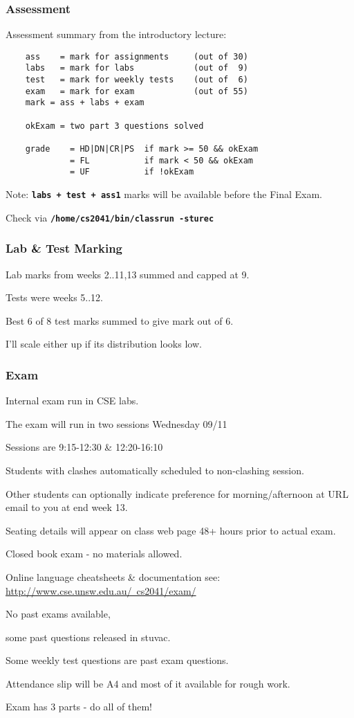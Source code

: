 \begin{frame}[fragile]
\frametitle{Assessment}
Assessment summary from the introductory lecture:
\begin{verbatim}
    ass    = mark for assignments     (out of 30)
    labs   = mark for labs            (out of  9)
    test   = mark for weekly tests    (out of  6)
    exam   = mark for exam            (out of 55)
    mark = ass + labs + exam 
   
    okExam = two part 3 questions solved
    
    grade    = HD|DN|CR|PS  if mark >= 50 && okExam
             = FL           if mark < 50 && okExam
             = UF           if !okExam
\end{verbatim}
Note: \textbf{\tt{labs + test + ass1}} marks will be available before the Final Exam.

Check via \textbf{\tt{/home/cs2041/bin/classrun -sturec}}
\end{frame}

\begin{frame}[fragile]
\frametitle{Lab \& Test Marking}
Lab marks from weeks 2..11,13 summed and capped at 9.

Tests were weeks 5..12.

Best 6 of 8 test marks summed to give mark out of 6.

I'll scale either up if its distribution looks low.

\end{frame}

\begin{frame}
\frametitle{Exam}

Internal exam run in CSE labs.

The exam will run in two sessions  Wednesday 09/11

Sessions are 9:15-12:30 \& 12:20-16:10

Students with clashes automatically scheduled to non-clashing session.

Other students can optionally indicate preference for morning/afternoon at
URL email to you at end week 13.

Seating details will appear on class web page 48+ hours prior to actual exam.

Closed book exam - no materials allowed.

Online language cheatsheets \& documentation see: \href{http://www.cse.unsw.edu.au/~cs2041/exam/}{http://www.cse.unsw.edu.au/~cs2041/exam/}

No past exams available,

some past questions released in stuvac.

Some weekly test questions are past exam questions.

Attendance slip will be A4 and most of it available for rough work.

Exam has 3 parts - do all of them!
\end{frame}

